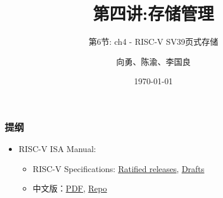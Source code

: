 


\title[第4讲]{第四讲:存储管理} %
\subtitle{第6节: ch4 - RISC-V SV39页式存储}
\author{向勇、陈渝、李国良} %
\date{\today} %



\begin{frame}
\titlepage %
\end{frame}

\begin{frame}
\frametitle{提纲} %
\tableofcontents %

\begin{itemize}
        \item RISC-V ISA Manual:
        \begin{itemize}
        \item RISC-V Specifications: \href{https://riscv.org/technical/specifications/}{Ratified releases}, \href{https://github.com/riscv/riscv-isa-manual/}{Drafts}
        \item 中文版：\href{http://crva.ict.ac.cn/documents/RISC-V-Reader-Chinese-v2p1.pdf}{PDF}, \href{https://github.com/Lingrui98/RISC-V-book}{Repo}
        \end{itemize}
\end{itemize}

\end{frame}

